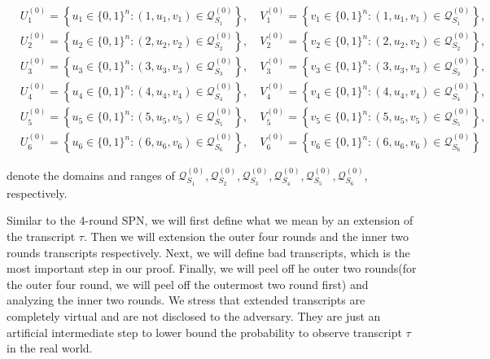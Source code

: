 $$
\begin{aligned}
&U_{1}^{(0)}=\left\{u_{1} \in\{0,1\}^{n}:\left(1, u_{1}, v_{1}\right) \in \mathcal{Q}_{S_{1}}^{(0)}\right\}, \quad V_{1}^{(0)}=\left\{v_{1} \in\{0,1\}^{n}:\left(1, u_{1}, v_{1}\right) \in \mathcal{Q}_{S_{1}}^{(0)}\right\},\\
&U_{2}^{(0)}=\left\{u_{2} \in\{0,1\}^{n}:\left(2, u_{2}, v_{2}\right) \in \mathcal{Q}_{S_{2}}^{(0)}\right\}, \quad V_{2}^{(0)}=\left\{v_{2} \in\{0,1\}^{n}:\left(2, u_{2}, v_{2}\right) \in \mathcal{Q}_{S_{2}}^{(0)}\right\},\\
&U_{3}^{(0)}=\left\{u_{3} \in\{0,1\}^{n}:\left(3, u_{3}, v_{3}\right) \in \mathcal{Q}_{S_{3}}^{(0)}\right\}, \quad V_{3}^{(0)}=\left\{v_{3} \in\{0,1\}^{n}:\left(3, u_{3}, v_{3}\right) \in \mathcal{Q}_{S_{3}}^{(0)}\right\},\\
&U_{4}^{(0)}=\left\{u_{4} \in\{0,1\}^{n}:\left(4, u_{4}, v_{4}\right) \in \mathcal{Q}_{S_{4}}^{(0)}\right\}, \quad V_{4}^{(0)}=\left\{v_{4} \in\{0,1\}^{n}:\left(4, u_{4}, v_{4}\right) \in \mathcal{Q}_{S_{4}}^{(0)}\right\},\\
&U_{5}^{(0)}=\left\{u_{5} \in\{0,1\}^{n}:\left(5, u_{5}, v_{5}\right) \in \mathcal{Q}_{S_{5}}^{(0)}\right\}, \quad V_{5}^{(0)}=\left\{v_{5} \in\{0,1\}^{n}:\left(5, u_{5}, v_{5}\right) \in \mathcal{Q}_{S_{5}}^{(0)}\right\},\\
&U_{6}^{(0)}=\left\{u_{6} \in\{0,1\}^{n}:\left(6, u_{6}, v_{6}\right) \in \mathcal{Q}_{S_{6}}^{(0)}\right\}, \quad V_{6}^{(0)}=\left\{v_{6} \in\{0,1\}^{n}:\left(6, u_{6}, v_{6}\right) \in \mathcal{Q}_{S_{6}}^{(0)}\right\}
\end{aligned}
$$

\noindent denote the domains and ranges of $\mathcal{Q}_{S_{1}}^{(0)}, \mathcal{Q}_{S_{2}}^{(0)}, \mathcal{Q}_{S_{3}}^{(0)}, \mathcal{Q}_{S_{4}}^{(0)}, \mathcal{Q}_{S_{5}}^{(0)}, \mathcal{Q}_{S_{6}}^{(0)}$, respectively.

Similar to the 4-round SPN, we will first define what we mean by an extension of the transcript $\tau$. Then we will extension the outer four rounds and the inner two rounds transcripts respectively. Next, we will define bad transcripts, which is the most important step in our proof. Finally, we will peel off he outer two rounds(for the outer four round, we will peel off the outermost two round first) and analyzing the inner two rounds. We stress that extended transcripts are completely virtual and are not disclosed to the adversary. They are just an artificial intermediate step to lower bound the probability to observe transcript $\tau$ in the real world.\\

